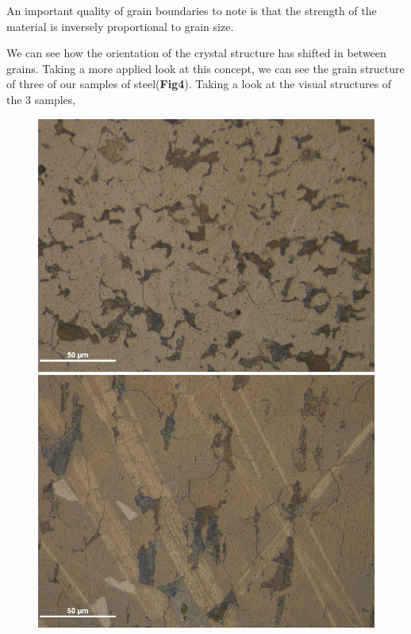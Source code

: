 \documentclass{article}
\begin{document}
An important quality of grain boundaries to note is that the strength of the material is inversely proportional to grain size. 

We can see how the orientation of the crystal structure has shifted in between grains. Taking a more applied look at this concept, we can see the grain structure of three of our samples of steel(\textbf{Fig4}). Taking a look at the visual structures of the 3 samples,

\begin{figure}[h]
	\begin{minipage}{0.32\textwidth}
		\centering
		\includegraphics[scale=.5]{TransAnnealedSteel.png}
	\end{minipage}
	\begin{minipage}{0.32\textwidth}
		\centering
		\includegraphics[scale=.5]{LongAnnealedSteel.png}

\end{minipage}
\end{figure}
\end{document}
